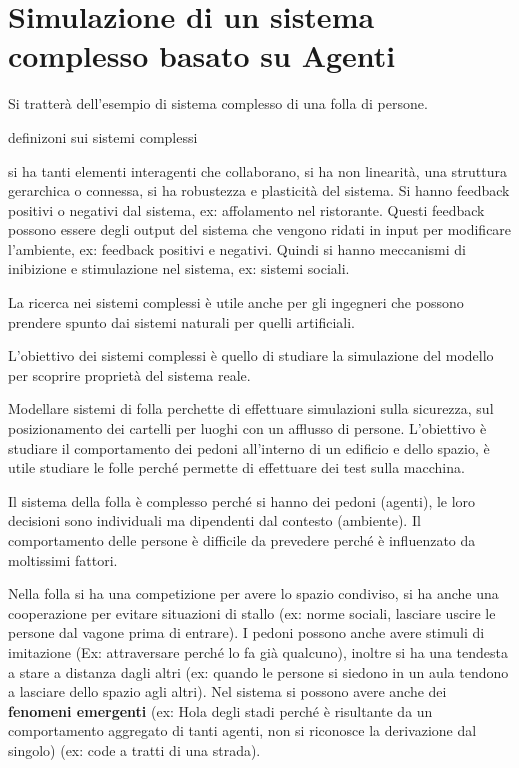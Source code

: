 \chapter{Simulazione di un sistema complesso basato su Agenti}
Si tratterà dell'esempio di sistema complesso di una folla di persone.

definizoni sui sistemi complessi

si ha tanti elementi interagenti che collaborano, si ha non linearità, una struttura 
gerarchica o connessa, si ha robustezza e plasticità del sistema. Si hanno feedback
positivi o negativi dal sistema, ex: affolamento nel ristorante. Questi feedback
possono essere degli output del sistema che vengono ridati in input per modificare 
l'ambiente, ex: feedback positivi e negativi. Quindi si hanno meccanismi di inibizione 
e stimulazione nel sistema, ex: sistemi sociali.

La ricerca nei sistemi complessi è utile anche per gli ingegneri che possono prendere 
spunto dai sistemi naturali per quelli artificiali.

L'obiettivo dei sistemi complessi è quello di studiare la simulazione del modello
per scoprire proprietà del sistema reale.

Modellare sistemi di folla perchette di effettuare simulazioni sulla sicurezza,
sul posizionamento dei cartelli per luoghi con un afflusso di persone.
L'obiettivo è studiare il comportamento dei pedoni all'interno di un edificio e dello spazio,
è utile studiare le folle perché permette di effettuare dei test sulla macchina.

Il sistema della folla è complesso perché si hanno dei pedoni (agenti), le loro 
decisioni sono individuali ma dipendenti dal contesto (ambiente). Il comportamento 
delle persone è difficile da prevedere perché è influenzato da moltissimi fattori.

Nella folla si ha una competizione per avere lo spazio condiviso, si ha anche una 
cooperazione per evitare situazioni di stallo (ex: norme sociali, lasciare uscire 
le persone dal vagone prima di entrare). I pedoni possono anche avere stimuli 
di imitazione (Ex: attraversare perché lo fa già qualcuno), inoltre si ha una 
tendesta a stare a distanza dagli altri (ex: quando le persone si siedono in un
aula tendono a lasciare dello spazio agli altri). Nel sistema si possono avere anche
dei \textbf{fenomeni emergenti} (ex: Hola degli stadi perché è risultante da un 
comportamento aggregato di tanti agenti, non si riconosce la derivazione dal singolo)
(ex: code a tratti di una strada).

